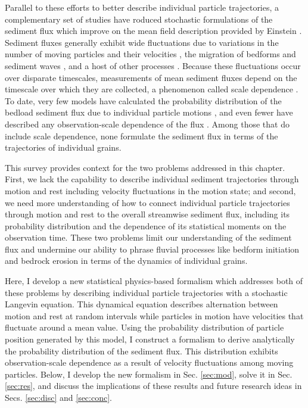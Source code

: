 Parallel to these efforts to better describe individual particle trajectories, a complementary set of studies have roduced stochastic formulations of the sediment flux which improve on the mean field description provided by Einstein \citep{Turowski2010,Furbish2012a,Ancey2020}. 
Sediment fluxes generally exhibit wide fluctuations due to variations in the number of moving particles and their velocities \citep{Bohm2005a,Ancey2006,Furbish2012a}, the migration of bedforms and sediment waves \citep{Guala2014,Recking2012}, and a host of other processes \citep{Dhont2018}.
Because these fluctuations occur over disparate timescales, measurements of mean sediment fluxes depend on the timescale over which they are collected, a phenomenon called scale dependence \citep{Saletti2015,Dhont2018,Singh2009,Turowski2010,Ancey2020}.
To date, very few models have calculated the probability distribution of the bedload sediment flux due to individual particle motions \citep{Ancey2008,Ancey2014}, and even fewer have described any observation-scale dependence of the flux \citep{Ancey2020a,Turowski2010}.
Among those that do include scale dependence, none formulate the sediment flux in terms of the trajectories of individual grains.

This survey provides context for the two problems addressed in this chapter.
First, we lack the capability to describe individual sediment trajectories through motion and rest including velocity fluctuations in the motion state; and second, we need more understanding of how to connect individual particle trajectories through motion and rest to the overall streamwise sediment flux, including its probability distribution and the dependence of its statistical moments on the observation time. These two problems limit our understanding of the sediment flux and undermine our ability to phrase fluvial processes like bedform initiation \citep[e.g.][]{Ashley2021} and bedrock erosion \citep[e.g.][]{Li2020a} in terms of the dynamics of individual grains.

Here, I develop a new statistical physics-based formalism which addresses both of these problems by describing individual particle trajectories with a stochastic Langevin equation.
This dynamical equation describes alternation between motion and rest at random intervals while particles in motion have velocities that fluctuate around a mean value.
Using the probability distribution of particle position generated by this model, I construct a formalism to derive analytically the probability distribution of the sediment flux.
This distribution exhibits observation-scale dependence as a result of velocity fluctuations among moving particles.
Below, I develop the new formalism in Sec. \ref{sec:mod}, solve it in Sec. \ref{sec:res}, and discuss the implications of these results and future research ideas in Secs. \ref{sec:disc} and \ref{sec:conc}.

